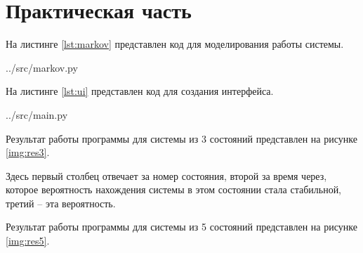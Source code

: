 \chapter{Практическая часть}

На листинге \ref{lst:markov} представлен код для моделирования работы системы.

\begin{lstinputlisting}[label=lst:markov,caption=Построение графиков для равномерного распределения, language=python, firstline=1, lastline=39]{../src/markov.py}
\end{lstinputlisting}

На листинге \ref{lst:ui} представлен код для создания интерфейса.

\begin{lstinputlisting}[label=lst:ui,caption=Построение графиков для равномерного распределения, language=python, firstline=7, lastline=55]{../src/main.py}
\end{lstinputlisting}

Результат работы программы для системы из 3 состояний представлен на рисунке \ref{img:res3}. 


Здесь первый столбец отвечает за номер состояния, второй за время через, которое вероятность нахождения системы в этом состоянии стала стабильной, третий -- эта вероятность.

Результат работы программы для системы из 5 состояний представлен на рисунке \ref{img:res5}.

